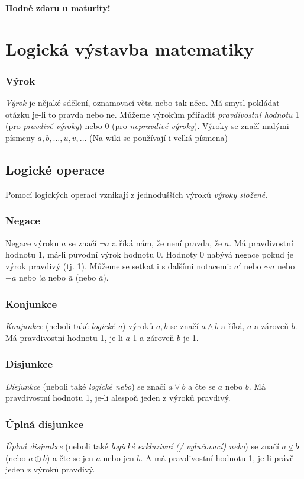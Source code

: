 \documentclass[12pt]{article}
\providecommand{\lxor}{\veebar}
\begin{document}
\begin{center}
       \vspace{1.5cm}
		\begin{LARGE}
		\textbf{Hodně zdaru u maturity!}
		\end{LARGE}
\end{center}

\newpage
{}
\section{Logická výstavba matematiky}
\subsubsection{Výrok}
\emph{Výrok} je nějaké sdělení, oznamovací věta nebo tak něco. Má smysl pokládat otázku je-li to pravda nebo ne. Můžeme výrokům přiřadit \emph{pravdivostní hodnotu} 1 (pro \emph{pravdivé výroky}) nebo 0 (pro \emph{nepravdivé výroky}). Výroky se značí malými písmeny $a,b, \dotsc, u,v, \dotsc$ (Na wiki se používají i velká písmena)
\subsection{Logické operace}
Pomocí logických operací vznikají z jednodušších výroků \emph{výroky složené}.
\subsubsection{Negace}
Negace výroku $a$ se značí $\neg a$ a říká nám, že není pravda, že $a$. Má pravdivostní hodnotu 1, má-li původní výrok hodnotu 0. Hodnoty 0 nabývá negace pokud je výrok pravdivý (tj. 1). Můžeme se setkat i s dalšími notacemi: $a'$ nebo $\sim a$ nebo $-a$ nebo $!a$ nebo $\bar{a}$ (nebo $\overline{a}$).
\subsubsection{Konjunkce}
\emph{Konjunkce} (neboli také \emph{logické a}) výroků $a,b$ se značí $a \land b$ a říká, $a$ a zároveň $b$. Má pravdivostní hodnotu 1, je-li $a$ 1 a zároveň $b$ je 1.
\subsubsection{Disjunkce}
\emph{Disjunkce} (neboli také \emph{logické nebo}) se značí $a \lor b$ a čte se $a$ nebo $b$. Má pravdivostní hodnotu 1, je-li alespoň jeden z výroků pravdivý.
\subsubsection{Úplná disjunkce}
\emph{Úplná disjunkce} (neboli také \emph{logické exkluzivní (/ vylučovací) nebo}) se značí $a \lxor b$ (nebo $a \oplus b$) a čte se jen $a$ nebo jen $b$. A má pravdivostní hodnotu 1, je-li právě jeden z výroků pravdivý.
\end{document}
